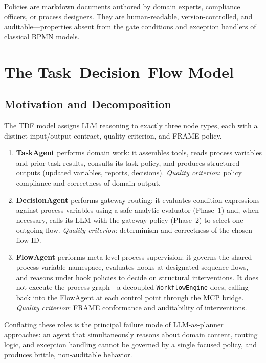 \documentclass[11pt,a4paper]{article}
\begin{document}
Policies are markdown documents authored by domain experts, compliance officers,
or process designers. They are human-readable, version-controlled, and
auditable---properties absent from the gate conditions and exception handlers of
classical BPMN models.

\section{The Task--Decision--Flow Model}
\label{sec:tdf}

\subsection{Motivation and Decomposition}

The TDF model assigns LLM reasoning to exactly three node types, each with a
distinct input/output contract, quality criterion, and FRAME policy.

\begin{enumerate}[label=\textbf{(\arabic*)}, leftmargin=*, noitemsep]
  \item \textbf{TaskAgent} performs domain work: it assembles tools, reads
        process variables and prior task results, consults its task policy, and
        produces structured outputs (updated variables, reports, decisions).
        \emph{Quality criterion}: policy compliance and correctness of domain output.
  \item \textbf{DecisionAgent} performs gateway routing: it evaluates condition
        expressions against process variables using a safe analytic evaluator
        (Phase~1) and, when necessary, calls its LLM with the gateway policy
        (Phase~2) to select one outgoing flow.
        \emph{Quality criterion}: determinism and correctness of the chosen flow ID.
  \item \textbf{FlowAgent} performs meta-level process supervision: it governs the
        shared process-variable namespace, evaluates hooks at designated sequence
        flows, and reasons under hook policies to decide on structural interventions.
        It does not execute the process graph---a decoupled \texttt{WorkflowEngine}
        does, calling back into the FlowAgent at each control point through the MCP
        bridge. \emph{Quality criterion}: FRAME conformance and auditability of interventions.
\end{enumerate}

Conflating these roles is the principal failure mode of LLM-as-planner approaches:
an agent that simultaneously reasons about domain content, routing logic, and
exception handling cannot be governed by a single focused policy, and produces
brittle, non-auditable behavior.
\end{document}
